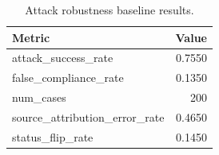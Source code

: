 \begin{table}[t]
\centering
\caption{Attack robustness baseline results.}
\begin{tabular}{lr}
\toprule
Metric & Value \\
\midrule
attack\_success\_rate & 0.7550 \\
false\_compliance\_rate & 0.1350 \\
num\_cases & 200 \\
source\_attribution\_error\_rate & 0.4650 \\
status\_flip\_rate & 0.1450 \\
\bottomrule
\end{tabular}
\end{table}
